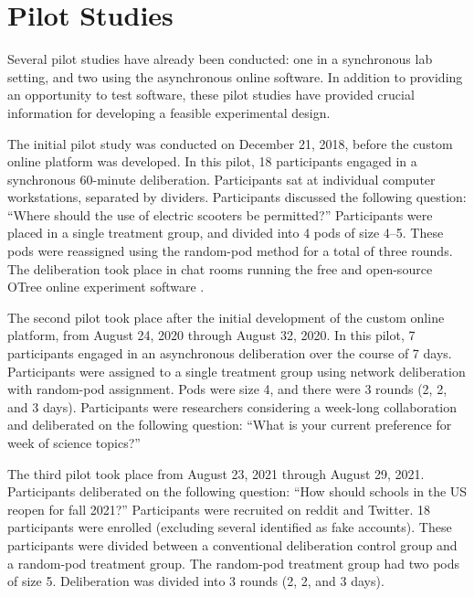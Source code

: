 \section{Pilot Studies}
Several pilot studies have already been conducted:
one in a synchronous lab setting, and two using the asynchronous online
software.
In addition to providing an opportunity to test software,
these pilot studies have provided crucial information for developing a
feasible experimental design.

The initial pilot study was conducted on December 21, 2018,
before the custom online platform was developed.
In this pilot, 18 participants engaged in a synchronous 60-minute deliberation.
Participants sat at individual computer workstations, separated by dividers.
Participants discussed the following question:
``Where should the use of electric scooters be permitted?''
Participants were placed in a single treatment group, and divided into 4
pods of size 4--5.
These pods were reassigned using the random-pod method for a total of three
rounds.
The deliberation took place in chat rooms running the free and open-source
OTree online experiment software \cite{chen_otreeopen-source_2016}.

The second pilot took place after the initial development of the custom online
platform, from August 24, 2020 through August 32, 2020.
In this pilot, 7 participants engaged in an asynchronous deliberation over the
course of 7 days.
Participants were assigned to a single treatment group using network deliberation
with random-pod assignment.
Pods were size 4, and there were 3 rounds (2, 2, and 3 days).
Participants were researchers considering a week-long collaboration and
deliberated on the following question:
``What is your current preference for week of science topics?''

The third pilot took place from August 23, 2021 through August 29, 2021.
Participants deliberated on the following question:
``How should schools in the US reopen for fall 2021?''
Participants were recruited on reddit and Twitter.
18 participants were enrolled (excluding several identified as fake accounts).
These participants were divided between a conventional deliberation control
group and a random-pod treatment group.
The random-pod treatment group had two pods of size 5.
Deliberation was divided into 3 rounds (2, 2, and 3 days).

